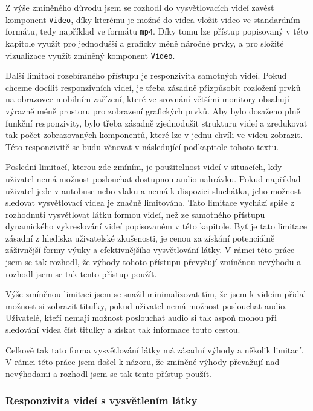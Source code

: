 Z výše zmíněného důvodu jsem se rozhodl do vysvětlovacích videí zavést komponent \texttt{Video}, díky kterému je možné do videa vložit video ve standardním formátu, tedy například ve formátu \texttt{mp4}. Díky tomu lze přístup popisovaný v této kapitole využít pro jednodušší a graficky méně náročné prvky, a pro složité vizualizace využít zmíněný komponent \texttt{Video}.

Další limitací rozebíraného přístupu je responzivita samotných videí. Pokud chceme docílit responzivních videí, je třeba zásadně přizpůsobit rozložení prvků na obrazovce mobilním zařízení, které ve srovnání většími monitory obsahují výrazně méně prostoru pro zobrazení grafických prvků. Aby bylo dosaženo plně funkční responzivity, bylo třeba zásadně zjednodušit strukturu videí a zredukovat tak počet zobrazovaných komponentů, které lze v jednu chvíli ve videu zobrazit. Této responzivitě se budu věnovat v následující podkapitole tohoto textu.

Poslední limitací, kterou zde zmíním, je použitelnost videí v situacích, kdy uživatel nemá možnost poslouchat dostupnou audio nahrávku. Pokud například uživatel jede v autobuse nebo vlaku a nemá k dispozici sluchátka, jeho možnost sledovat vysvětlovací videa je značně limitována. Tato limitace vychází spíše z rozhodnutí vysvětlovat látku formou videí, než ze samotného přístupu dynamického vykreslování videí popisovaném v této kapitole. Byť je tato limitace zásadní z hlediska uživatelské zkušenosti, je cenou za získání potenciálně záživnější formy výuky a efektivnějšího vysvětlování látky. V rámci této práce jsem se tak rozhodl, že výhody tohoto přístupu převyšují zmíněnou nevýhodu a rozhodl jsem se tak tento přístup použít.

Výše zmíněnou limitaci jsem se snažil minimalizovat tím, že jsem k videím přidal možnost si zobrazit titulky, pokud uživatel nemá možnost poslouchat audio. Uživatelé, kteří nemají možnost poslouchat audio si tak aspoň mohou při sledování videa číst titulky a získat tak informace touto cestou.

Celkově tak tato forma vysvětlování látky má zásadní výhody a několik limitací. V rámci této práce jsem došel k názoru, že zmíněné výhody převažují nad nevýhodami a rozhodl jsem se tak tento přístup použít.

\subsubsection{Responzivita videí s vysvětlením látky}

